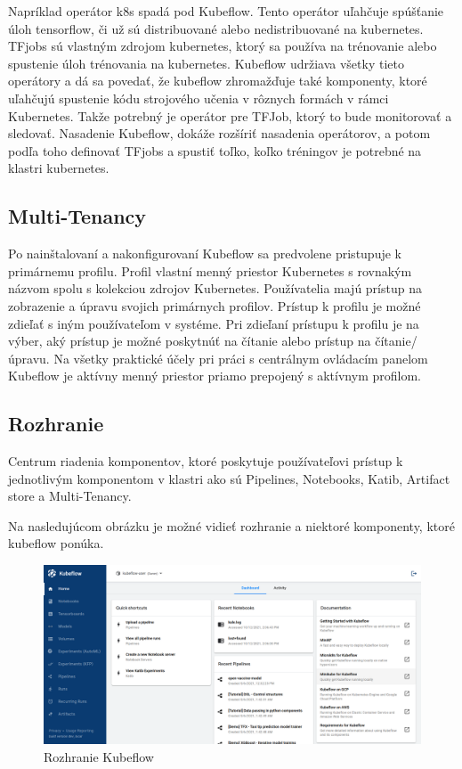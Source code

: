 Napríklad operátor k8s spadá pod Kubeflow. Tento operátor uľahčuje spúšťanie úloh tensorflow, či už sú distribuované alebo nedistribuované na kubernetes. TFjobs sú vlastným zdrojom kubernetes, ktorý sa používa na trénovanie alebo spustenie úloh trénovania na kubernetes. Kubeflow udržiava všetky tieto operátory a dá sa povedať, že kubeflow zhromažďuje také komponenty, ktoré uľahčujú spustenie kódu strojového učenia v rôznych formách v rámci Kubernetes. Takže potrebný je operátor pre TFJob, ktorý to bude monitorovať a sledovať. Nasadenie Kubeflow, dokáže rozšíriť nasadenia operátorov, a potom podľa toho definovať TFjobs a spustiť toľko, koľko tréningov je potrebné na klastri kubernetes.

\subsection*{Multi-Tenancy}

Po nainštalovaní a nakonfigurovaní Kubeflow sa predvolene pristupuje k primárnemu profilu. Profil vlastní menný priestor Kubernetes s rovnakým názvom spolu s kolekciou zdrojov Kubernetes. Používatelia majú prístup na zobrazenie a úpravu svojich primárnych profilov. Prístup k profilu je možné zdieľať s iným používateľom v systéme. Pri zdieľaní prístupu k profilu je na výber, aký prístup je možné poskytnúť na čítanie alebo prístup na čítanie/úpravu. Na všetky praktické účely pri práci s centrálnym ovládacím panelom Kubeflow je aktívny menný priestor priamo prepojený s aktívnym profilom.

\subsection*{Rozhranie}

Centrum riadenia komponentov, ktoré poskytuje používateľovi prístup k jednotlivým komponentom v klastri ako sú Pipelines, Notebooks, Katib, Artifact store a Multi-Tenancy.

Na nasledujúcom obrázku je možné vidieť rozhranie a niektoré komponenty, ktoré kubeflow ponúka.

\clearpage

\begin{figure}[h!]
    \includegraphics[width=\linewidth]{figures/Rozhranie}
    \caption{ Rozhranie Kubeflow }
\end{figure}

